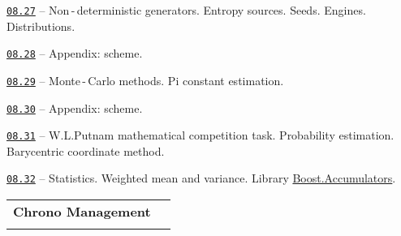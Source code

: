 \documentclass[a4paper,12pt]{article}
\renewenvironment{itemize}
{
    \begin{list}{\labelitemi}
    {
      \setlength{\topsep}{0pt}
      \setlength{\partopsep}{0pt}
      \setlength{\parskip}{0pt}
      \setlength{\itemsep}{0pt}
      \setlength{\parsep}{0pt}
      \setlength{\leftmargin}{14.5pt}
    }
}{\end{list}}
\begin{document}
\medskip\smallskip

\begin{itemize}

    \item \href{https://github.com/i-s-m-mipt/Education/blob/master/projects/examples/source/08.27.cpp}{\texttt{08.27}} -- Non\,-\,deterministic generators. Entropy sources. Seeds. Engines. Distributions.

    \smallskip

    \item \href{https://github.com/i-s-m-mipt/Education/blob/master/projects/examples/source/08.28.pdf}{\texttt{08.28}} -- Appendix: scheme.

    \smallskip

    \item \href{https://github.com/i-s-m-mipt/Education/blob/master/projects/examples/source/08.29.cpp}{\texttt{08.29}} -- Monte\,-\,Carlo methods. Pi constant estimation.

    \smallskip

    \item \href{https://github.com/i-s-m-mipt/Education/blob/master/projects/examples/source/08.30.pdf}{\texttt{08.30}} -- Appendix: scheme.

    \smallskip

    \item \href{https://github.com/i-s-m-mipt/Education/blob/master/projects/examples/source/08.31.cpp}{\texttt{08.31}} -- W.\:L.\:Putnam mathematical competition task. Probability estimation. Barycentric coordinate method.

    \smallskip

    \item \href{https://github.com/i-s-m-mipt/Education/blob/master/projects/examples/source/08.32.cpp}{\texttt{08.32}} -- Statistics. Weighted mean and variance. Library \href{https://www.boost.org/doc/libs/1_89_0/doc/html/accumulators.html}{Boost.Accumulators}.

\end{itemize}

\bigskip\medskip

\begin{tabular}{!{\vrule width 1pt}L{4.2cm}!{\vrule width 1pt}L{14.8cm}!{\vrule width 0pt}} 


\textbf{Chrono Management} & \\


\end{tabular}
\end{document}
